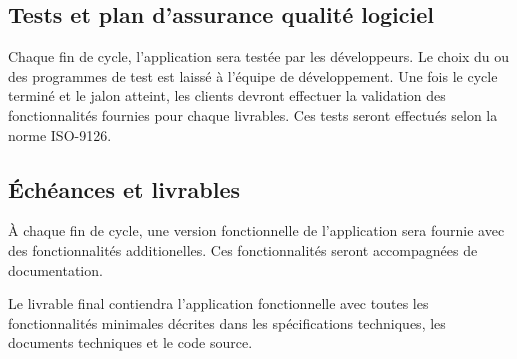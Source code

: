 \documentclass{scrartcl}
\begin{document}
	\subsection{Tests et plan d'assurance qualité logiciel}
		Chaque fin de cycle, l'application sera testée par les développeurs. Le choix du ou des programmes de test est laissé à l'équipe de développement. Une fois le cycle terminé et le jalon atteint, les clients devront effectuer la validation des fonctionnalités fournies pour chaque livrables. Ces tests seront effectués selon la norme ISO-9126.

			
\newpage
	\subsection{Échéances et livrables}
		\`A chaque fin de cycle, une version fonctionnelle de l'application sera fournie avec des fonctionnalités additionelles. Ces fonctionnalités seront accompagnées de documentation.
		
		Le livrable final contiendra l'application fonctionnelle avec toutes les fonctionnalités minimales décrites dans les spécifications techniques, les documents techniques et le code source.
		
\end{document}
